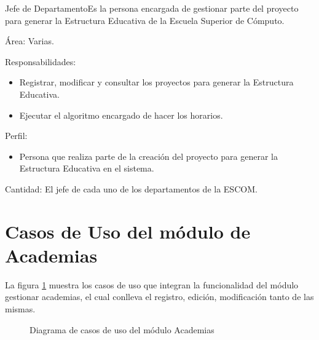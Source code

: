 \begin{actor}{Jefe de Departamento}{Es la persona encargada de gestionar parte del proyecto para generar la Estructura Educativa de la Escuela Superior de Cómputo.}
	
	\item[Área:] Varias.
	\item[Responsabilidades:] \hspace{1pt}
	\begin{itemize}
		\item Registrar, modificar y consultar los proyectos para generar la Estructura Educativa.
		
		\item Ejecutar el algoritmo encargado de hacer los horarios.
		
	\end{itemize}
	\item[Perfil:] \hspace{1pt}
	\begin{itemize}
		\item Persona que realiza parte de la creación del proyecto para generar la Estructura Educativa en el sistema.
	\end{itemize}
	\item[Cantidad:] El jefe de cada uno de los departamentos de la ESCOM.
\end{actor}


\newpage 

\section{Casos de Uso del módulo de Academias}

La figura \ref{fig:casosUso:gestionarAcademias} muestra los casos de uso que integran la funcionalidad del módulo gestionar academias, el cual conlleva el registro, edición, modificación tanto de las mismas.
\begin{figure}[htpb!]
	\begin{center}
		\caption{Diagrama de casos de uso del módulo Academias \label{fig:casosUso:gestionarAcademias}}
	\end{center}
\end{figure}

